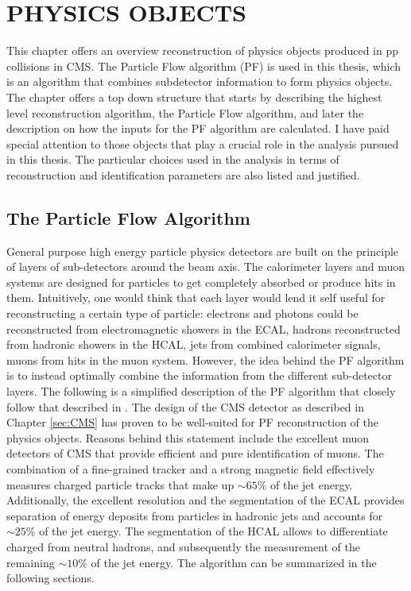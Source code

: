 \chapter{PHYSICS OBJECTS}\label{sec:objects}
\noindent\justify
This chapter offers an overview reconstruction of physics objects produced in pp collisions in CMS. 
The Particle Flow algorithm (PF) is used in this thesis, which is an algorithm that combines subdetector information to form physics objects. 
\newpara
\noindent\justify
The chapter offers a top down structure that starts by describing the highest level reconstruction algorithm, the Particle Flow algorithm, and later the description on how the inputs for the PF algorithm are calculated. 
I have paid special attention to those objects that play a crucial role in the analysis pursued in this thesis. 
The particular choices used in the analysis in terms of reconstruction and identification parameters are also listed and justified.
\newpage
\section{The Particle Flow Algorithm}\label{sec:PF}
\noindent\justify
General purpose high energy particle physics detectors are built on the principle of layers of sub-detectors around the beam axis. 
The calorimeter layers and muon systems are designed for particles to get completely absorbed or produce hits in them. 
Intuitively, one would think that each layer would lend it self useful for reconstructing a certain type of particle: electrons and photons could be reconstructed from electromagnetic showers in the ECAL, hadrons reconstructed from hadronic showers in the HCAL, jets from combined calorimeter signals, muons from hits in the muon system. 
However, the idea behind the PF algorithm is to instead optimally combine the information from the different sub-detector layers.   
The following is a simplified description of the PF algorithm that closely follow that described in \cite{Sirunyan:2017ulk}.
The design of the CMS detector as described in Chapter \ref{sec:CMS} has proven to be well-suited for PF reconstruction of the physics objects. 
Reasons behind this statement include the excellent muon detectors of CMS that provide efficient and pure identification of muons. 
The combination of a fine-grained tracker and a strong magnetic field effectively measures charged particle tracks that make up $\sim65\%$ of the jet energy. 
Additionally, the excellent resolution and the segmentation of the ECAL provides separation of energy deposits from particles in hadronic jets and accounts for $\sim25\%$ of the jet energy. 
The segmentation of the HCAL allows to differentiate charged from neutral hadrons, and subsequently the measurement of the remaining $\sim10\%$ of the jet energy. 
The algorithm can be summarized in the following sections.
